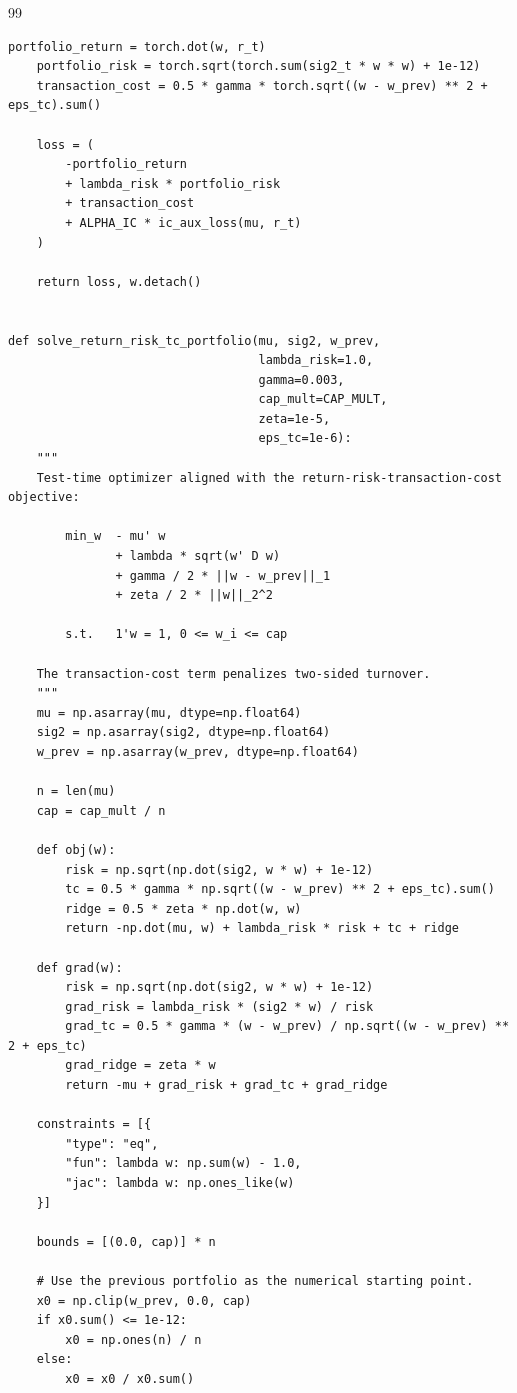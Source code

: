 \documentclass[11pt]{article}
\begin{document}
\begin{thebibliography}{99}
\begin{lstlisting}[style=appendixpython,caption={Core implementation of the return-plus-risk-plus-transaction-cost objective}]
    portfolio_return = torch.dot(w, r_t)
    portfolio_risk = torch.sqrt(torch.sum(sig2_t * w * w) + 1e-12)
    transaction_cost = 0.5 * gamma * torch.sqrt((w - w_prev) ** 2 + eps_tc).sum()

    loss = (
        -portfolio_return
        + lambda_risk * portfolio_risk
        + transaction_cost
        + ALPHA_IC * ic_aux_loss(mu, r_t)
    )

    return loss, w.detach()


def solve_return_risk_tc_portfolio(mu, sig2, w_prev,
                                   lambda_risk=1.0,
                                   gamma=0.003,
                                   cap_mult=CAP_MULT,
                                   zeta=1e-5,
                                   eps_tc=1e-6):
    """
    Test-time optimizer aligned with the return-risk-transaction-cost objective:

        min_w  - mu' w
               + lambda * sqrt(w' D w)
               + gamma / 2 * ||w - w_prev||_1
               + zeta / 2 * ||w||_2^2

        s.t.   1'w = 1, 0 <= w_i <= cap

    The transaction-cost term penalizes two-sided turnover.
    """
    mu = np.asarray(mu, dtype=np.float64)
    sig2 = np.asarray(sig2, dtype=np.float64)
    w_prev = np.asarray(w_prev, dtype=np.float64)

    n = len(mu)
    cap = cap_mult / n

    def obj(w):
        risk = np.sqrt(np.dot(sig2, w * w) + 1e-12)
        tc = 0.5 * gamma * np.sqrt((w - w_prev) ** 2 + eps_tc).sum()
        ridge = 0.5 * zeta * np.dot(w, w)
        return -np.dot(mu, w) + lambda_risk * risk + tc + ridge

    def grad(w):
        risk = np.sqrt(np.dot(sig2, w * w) + 1e-12)
        grad_risk = lambda_risk * (sig2 * w) / risk
        grad_tc = 0.5 * gamma * (w - w_prev) / np.sqrt((w - w_prev) ** 2 + eps_tc)
        grad_ridge = zeta * w
        return -mu + grad_risk + grad_tc + grad_ridge

    constraints = [{
        "type": "eq",
        "fun": lambda w: np.sum(w) - 1.0,
        "jac": lambda w: np.ones_like(w)
    }]

    bounds = [(0.0, cap)] * n

    # Use the previous portfolio as the numerical starting point.
    x0 = np.clip(w_prev, 0.0, cap)
    if x0.sum() <= 1e-12:
        x0 = np.ones(n) / n
    else:
        x0 = x0 / x0.sum()


\end{lstlisting}
\end{thebibliography}
\end{document}
